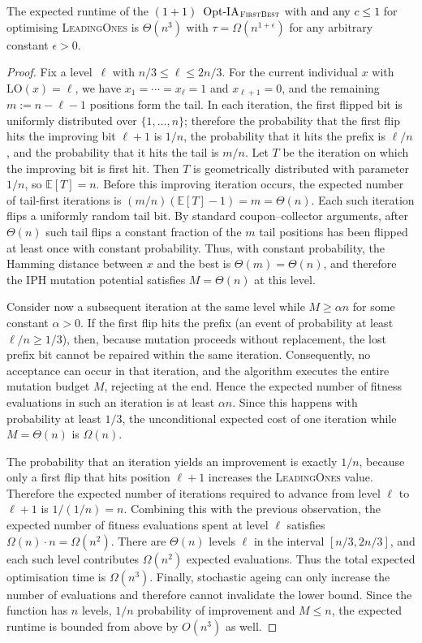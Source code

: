 \documentclass[lettersize,journal]{IEEEtran}
\newcommand{\new}[1]{\textcolor{black}{#1}}
\begin{document}
\begin{theorem} \label{thm:leadingonesexpo}
The expected runtime of the \new{$(1+1)$~Opt-IA$_{\textsc{FirstBest}}$}  %
with {\linHD } \new{and any $c\leq 1$} for optimising
\textsc{LeadingOnes} is $\Theta(n^3)$ with $\tau=\Omega(n^{1+\epsilon})$ for any arbitrary 
constant $\epsilon>0$.
\end{theorem}
\begin{proof}
	
Fix a level~$\ell$ with $n/3\le \ell\le 2n/3$. For the current individual $x$ with $\mathrm{LO}(x)=\ell$, we have $x_1=\cdots=x_{\ell}=1$ and $x_{\ell+1}=0$, and the remaining $m:=n-\ell-1$ positions form the tail. In each iteration, the first flipped bit is uniformly distributed over $\{1,\dots,n\}$; therefore the probability that the first flip hits the improving bit $\ell+1$ is $1/n$, the probability that it hits the prefix is $\ell/n$, and the probability that it hits the tail is $m/n$. Let $T$ be the iteration on which the improving bit is first hit. Then $T$ is geometrically distributed with parameter~$1/n$, so $\mathbb{E}[T]=n$. Before this improving iteration occurs, the expected number of tail-first iterations is $(m/n)(\mathbb{E}[T]-1)=m=\Theta(n)$. Each such iteration flips a uniformly random tail bit. By standard coupon–collector arguments, after $\Theta(n)$ such tail flips a constant fraction of the $m$ tail positions has been flipped at least once with constant probability. Thus, with constant probability, the Hamming distance between $x$ and the best is $\Theta(m)=\Theta(n)$, and therefore the IPH mutation potential satisfies $M=\Theta(n)$ at this level.
	
	Consider now a subsequent iteration at the same level while $M\ge \alpha n$ for some constant $\alpha>0$. If the first flip hits the prefix (an event of probability at least $\ell/n\ge 1/3$), then, because mutation proceeds without replacement, the lost prefix bit cannot be repaired within the same iteration. Consequently, no acceptance can occur in that iteration, and the algorithm executes the entire mutation budget $M$, rejecting at the end. Hence the expected number of fitness evaluations in such an iteration is at least $\alpha n$. Since this happens with probability at least $1/3$, the unconditional expected cost of one iteration while $M=\Theta(n)$ is $\Omega(n)$.
	
	The probability that an iteration yields an improvement is exactly $1/n$, because only a first flip that hits position $\ell+1$ increases the \textsc{LeadingOnes} value. Therefore the expected number of iterations required to advance from level $\ell$ to $\ell+1$ is $1/(1/n)=n$. Combining this with the previous observation, the expected number of fitness evaluations spent at level $\ell$ satisfies $\Omega(n)\cdot n=\Omega(n^2)$.
	There are $\Theta(n)$ levels $\ell$ in the interval $[n/3,2n/3]$, and each such level contributes $\Omega(n^2)$ expected evaluations. Thus the total expected optimisation time is $\Omega(n^3)$. Finally, stochastic ageing can only increase the number of evaluations and therefore cannot invalidate the lower bound. Since the function has $n$ levels, $1/n$ probability of improvement and $M\leq n$, the expected runtime is bounded from above by $O(n^3)$ as well.
	

\end{proof}
\end{document}
